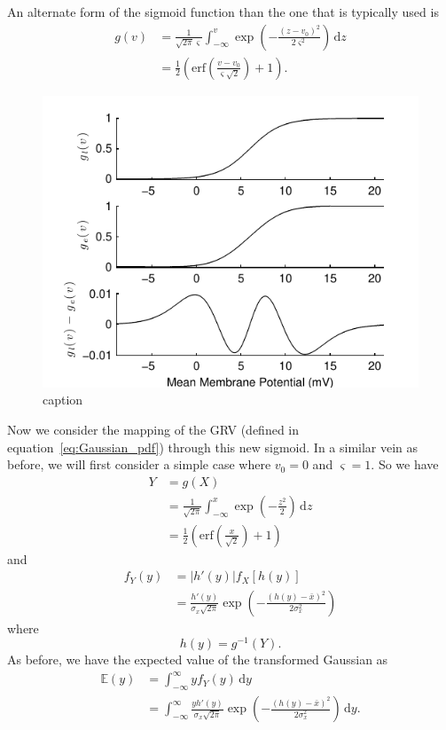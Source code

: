 \documentclass[]{article}
\begin{document}
An alternate form of the sigmoid function than the one that is typically used is
\begin{align}
	g(v) &= \frac{1}{\sqrt{2\pi}\varsigma}\int_{-\infty}^{v}\exp\left(-\frac{(z-v_0)^2}{2\varsigma^2}\right)\,\mathrm{d}z \\
	&= \frac{1}{2}\left(\mathrm{erf}\left(\frac{v-v_0}{\varsigma\sqrt{2}}\right) + 1\right).
\end{align}
\begin{figure}[ht!]
	\centering
		\includegraphics[scale=1]{./Figures/pdf/DifferentSigmoids.pdf}
	\caption{caption}
	\label{fig:label}
\end{figure}

Now we consider the mapping of the GRV (defined in equation~\ref{eq:Gaussian_pdf}) through this new sigmoid. In a similar vein as before, we will first consider a simple case where $v_0 = 0$ and $\varsigma = 1$. So we have
\begin{align}
	Y &= g(X) \\
	&= \frac{1}{\sqrt{2\pi}}\int_{-\infty}^{x}\exp\left(-\frac{z^2}{2}\right)\,\mathrm{d}z \\
	&= \frac{1}{2}\left(\mathrm{erf}\left(\frac{x}{\sqrt{2}}\right) + 1\right)
\end{align}
and
\begin{align}
	f_Y(y) &= |h'(y)|f_X[h(y)] \\
	&= \frac{h'(y)}{\sigma_x\sqrt{2\pi}}\exp\left(-\frac{(h(y)-\bar{x})^2}{2\sigma_x^2}\right)
\end{align}
where
\begin{equation}
	h(y) = g^{-1}(Y).
\end{equation}
As before, we have the expected value of the transformed Gaussian as
\begin{align}
	\mathbb{E}(y) &= \int_{-\infty}^{\infty}yf_Y(y) \,\mathrm{d}y \\
	&=\int_{-\infty}^{\infty}\frac{y h'(y)}{\sigma_x\sqrt{2\pi}}\exp\left(-\frac{(h(y)-\bar{x})^2}{2\sigma_x^2}\right)\,\mathrm{d}y. \label{eq:expected_value_erf_sigmoid}
\end{align}
\end{document}
